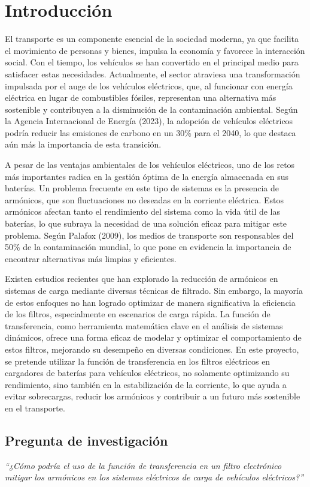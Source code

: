 \section{Introducci\'on}
\label{sec:introduccion}

El transporte es un componente esencial de la sociedad moderna, ya que facilita el movimiento de personas y bienes, impulsa la econom\'ia y favorece la interacci\'on social. Con el tiempo, los veh\'iculos se han convertido en el principal medio para satisfacer estas necesidades. Actualmente, el sector atraviesa una transformaci\'on impulsada por el auge de los veh\'iculos el\'ectricos, que, al funcionar con energ\'ia el\'ectrica en lugar de combustibles f\'osiles, representan una alternativa m\'as sostenible y contribuyen a la disminuci\'on de la contaminaci\'on ambiental. Seg\'un la Agencia Internacional de Energ\'ia (2023), la adopci\'on de veh\'iculos el\'ectricos podr\'ia reducir las emisiones de carbono en un 30\% para el 2040, lo que destaca a\'un m\'as la importancia de esta transici\'on.

A pesar de las ventajas ambientales de los veh\'iculos el\'ectricos, uno de los retos m\'as importantes radica en la gesti\'on \'optima de la energ\'ia almacenada en sus bater\'ias. Un problema frecuente en este tipo de sistemas es la presencia de arm\'onicos, que son fluctuaciones no deseadas en la corriente el\'ectrica. Estos arm\'onicos afectan tanto el rendimiento del sistema como la vida \'util de las bater\'ias, lo que subraya la necesidad de una soluci\'on eficaz para mitigar este problema. Seg\'un Palafox (2009), los medios de transporte son responsables del 50\% de la contaminaci\'on mundial, lo que pone en evidencia la importancia de encontrar alternativas m\'as limpias y eficientes.

Existen estudios recientes que han explorado la reducci\'on de arm\'onicos en sistemas de carga mediante diversas t\'ecnicas de filtrado. Sin embargo, la mayor\'ia de estos enfoques no han logrado optimizar de manera significativa la eficiencia de los filtros, especialmente en escenarios de carga r\'apida. La funci\'on de transferencia, como herramienta matem\'atica clave en el an\'alisis de sistemas din\'amicos, ofrece una forma eficaz de modelar y optimizar el comportamiento de estos filtros, mejorando su desempe\~no en diversas condiciones. En este proyecto, se pretende utilizar la funci\'on de transferencia en los filtros el\'ectricos en cargadores de bater\'ias para veh\'iculos el\'ectricos, no solamente optimizando su rendimiento, sino tambi\'en en la estabilizaci\'on de la corriente, lo que ayuda a evitar sobrecargas, reducir los arm\'onicos y contribuir a un futuro m\'as sostenible en el transporte.

\subsection*{Pregunta de investigaci\'on}
\textit{“¿C\'omo podr\'ia el uso de la funci\'on de transferencia en un filtro electr\'onico mitigar los arm\'onicos en los sistemas el\'ectricos de carga de veh\'iculos el\'ectricos?”}
\newpage
